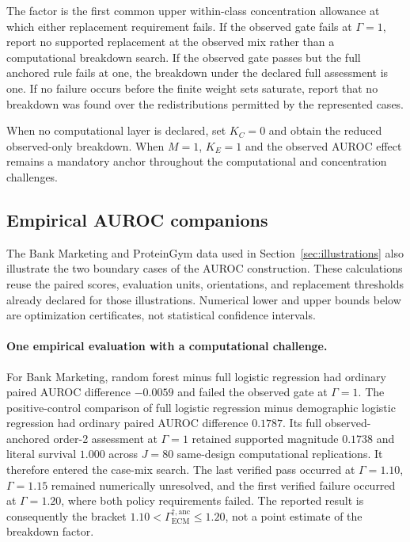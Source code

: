 \documentclass[11pt]{article}
\theoremstyle{remark}
\begin{document}
The factor is the first common upper within-class concentration allowance at
which either replacement requirement fails. If the observed gate fails at
$\Gamma=1$, report no supported replacement at the observed mix rather than a
computational breakdown search. If the observed gate passes but the full
anchored rule fails at one, the breakdown under the declared full assessment
is one. If no failure occurs before the finite weight sets saturate, report that
no breakdown was found over the redistributions permitted by the represented
cases.

When no computational layer is declared, set $K_C=0$ and obtain the reduced
observed-only breakdown. When $M=1$, $K_E=1$ and the observed AUROC effect
remains a mandatory anchor throughout the computational and concentration
challenges.

\subsection{Empirical AUROC companions}
\label{app:auroc-illustrations}

The Bank Marketing and ProteinGym data used in
Section~\ref{sec:illustrations} also illustrate the two boundary cases of the
AUROC construction. These calculations reuse the paired scores, evaluation
units, orientations, and replacement thresholds already declared for those
illustrations. Numerical lower and upper bounds below are optimization
certificates, not statistical confidence intervals.

\paragraph{One empirical evaluation with a computational challenge.}
For Bank Marketing, random forest minus full logistic regression had ordinary
paired AUROC difference $-0.0059$ and failed the observed gate at
$\Gamma=1$. The positive-control comparison of full logistic regression minus
demographic logistic regression had ordinary paired AUROC difference $0.1787$.
Its full observed-anchored order-2 assessment at $\Gamma=1$ retained supported
magnitude $0.1738$ and literal survival $1.000$ across $J=80$ same-design
computational replications. It therefore entered the case-mix search. The last
verified pass occurred at $\Gamma=1.10$, $\Gamma=1.15$ remained numerically
unresolved, and the first verified failure occurred at $\Gamma=1.20$, where
both policy requirements failed. The reported result is consequently the
bracket $1.10<\Gamma_{\mathrm{ECM}}^{\dagger,\mathrm{anc}}\leq1.20$, not a
point estimate of the breakdown factor.
\end{document}
